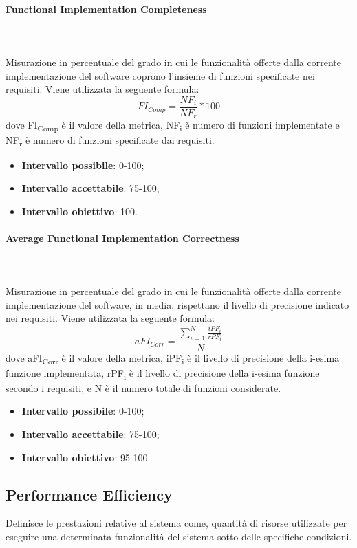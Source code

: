 \paragraph{Functional Implementation Completeness} ~\\ ~\\
Misurazione in percentuale del grado in cui le funzionalità offerte dalla corrente implementazione del software coprono l'insieme di funzioni specificate nei requisiti.
Viene utilizzata la seguente formula:
$$FI_{Comp}=\frac{NF_i}{NF_r}*100$$
dove FI\textsubscript{Comp} è il valore della metrica, NF\textsubscript{i} è numero di funzioni implementate e NF\textsubscript{r} è numero di funzioni specificate dai requisiti.
\begin{itemize}
	\item{\textbf{Intervallo possibile}: 0-100;}
	\item{\textbf{Intervallo accettabile}: 75-100;}
	\item{\textbf{Intervallo obiettivo}: 100.}
\end{itemize}

\paragraph{Average Functional Implementation Correctness} ~\\ ~\\
Misurazione in percentuale del grado in cui le funzionalità offerte dalla corrente implementazione del software, in media, rispettano il livello di precisione indicato nei requisiti.
Viene utilizzata la seguente formula:
$$aFI_{Corr}=\frac{\sum\limits_{i=1}^N\frac{iPF_i}{rPF_i}}{N}$$
dove aFI\textsubscript{Corr} è il valore della metrica, iPF\textsubscript{i} è il livello di precisione della i-esima funzione implementata, rPF\textsubscript{i} è il livello di precisione della i-esima funzione secondo i requisiti, e N è il numero totale di funzioni considerate.
\begin{itemize}
	\item{\textbf{Intervallo possibile}: 0-100;}
	\item{\textbf{Intervallo accettabile}: 75-100;}
	\item{\textbf{Intervallo obiettivo}: 95-100.}
\end{itemize}

\subsection{Performance Efficiency}
Definisce le prestazioni relative al sistema come, quantità di risorse utilizzate per eseguire una determinata funzionalità del sistema sotto delle specifiche condizioni. 
